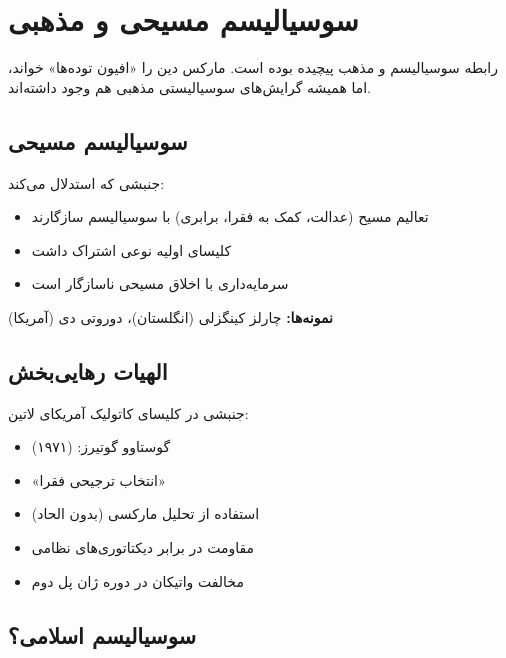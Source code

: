 \section{سوسیالیسم مسیحی و مذهبی}

رابطه سوسیالیسم و مذهب پیچیده بوده است. مارکس دین را «افیون توده‌ها» خواند، اما همیشه گرایش‌های سوسیالیستی مذهبی هم وجود داشته‌اند.

\subsection{سوسیالیسم مسیحی}

\begin{defbox}
جنبشی که استدلال می‌کند:
\begin{itemize}[nosep]
    \item تعالیم مسیح (عدالت، کمک به فقرا، برابری) با سوسیالیسم سازگارند
    \item کلیسای اولیه نوعی اشتراک داشت
    \item سرمایه‌داری با اخلاق مسیحی ناسازگار است
\end{itemize}
\textbf{نمونه‌ها:} چارلز کینگزلی (انگلستان)، دوروتی دی (آمریکا)
\end{defbox}

\subsection{الهیات رهایی‌بخش}

\begin{historybox}
جنبشی در کلیسای کاتولیک آمریکای لاتین:
\begin{itemize}[nosep]
    \item گوستاوو گوتیرز:  (۱۹۷۱)
    \item «انتخاب ترجیحی فقرا»
    \item استفاده از تحلیل مارکسی (بدون الحاد)
    \item مقاومت در برابر دیکتاتوری‌های نظامی
    \item مخالفت واتیکان در دوره ژان پل دوم
\end{itemize}
\end{historybox}

\subsection{سوسیالیسم اسلامی؟}

